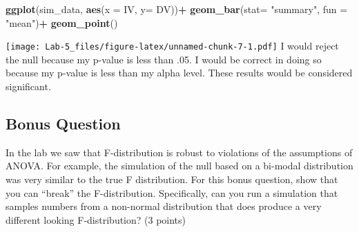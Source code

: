 \documentclass[
]{article}
\newenvironment{Shaded}{\begin{snugshade}}{\end{snugshade}}
\newcommand{\DataTypeTok}[1]{\textcolor[rgb]{0.13,0.29,0.53}{#1}}
\newcommand{\KeywordTok}[1]{\textcolor[rgb]{0.13,0.29,0.53}{\textbf{#1}}}
\newcommand{\NormalTok}[1]{#1}
\newcommand{\OperatorTok}[1]{\textcolor[rgb]{0.81,0.36,0.00}{\textbf{#1}}}
\newcommand{\StringTok}[1]{\textcolor[rgb]{0.31,0.60,0.02}{#1}}
\begin{document}
\begin{Shaded}
\begin{Highlighting}[]
\KeywordTok{ggplot}\NormalTok{(sim_data, }\KeywordTok{aes}\NormalTok{(}\DataTypeTok{x =}\NormalTok{ IV, }\DataTypeTok{y=}\NormalTok{ DV))}\OperatorTok{+}
\StringTok{  }\KeywordTok{geom_bar}\NormalTok{(}\DataTypeTok{stat=} \StringTok{"summary"}\NormalTok{, }\DataTypeTok{fun =} \StringTok{"mean"}\NormalTok{)}\OperatorTok{+}
\StringTok{  }\KeywordTok{geom_point}\NormalTok{()}
\end{Highlighting}
\end{Shaded}

\texttt{[image: Lab-5\_files/figure-latex/unnamed-chunk-7-1.pdf]} I would
reject the null because my p-value is less than .05. I would be correct
in doing so because my p-value is less than my alpha level. These
results would be considered significant.

\hypertarget{bonus-question}{%
\subsection{Bonus Question}\label{bonus-question}}

In the lab we saw that F-distribution is robust to violations of the
assumptions of ANOVA. For example, the simulation of the null based on a
bi-modal distribution was very similar to the true F distribution. For
this bonus question, show that you can ``break'' the F-distribution.
Specifically, can you run a simulation that samples numbers from a
non-normal distribution that does produce a very different looking
F-distribution? (3 points)
\end{document}
